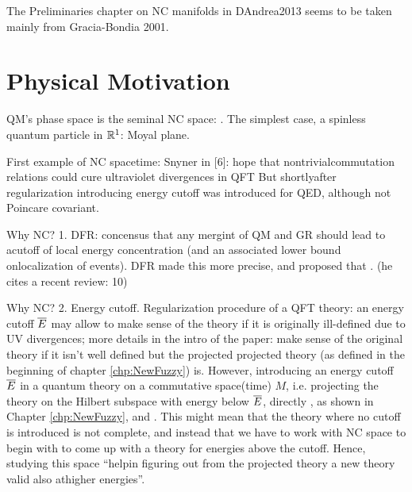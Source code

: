 The Preliminaries chapter on NC manifolds in DAndrea2013 seems to be taken mainly from Gracia-Bondia 2001.

\section{Physical Motivation}

{ \color{gray}
 
    QM's phase space is the seminal NC space: . The simplest case, a spinless quantum particle in $\mathbb{R}^1$: Moyal plane.
    
    First example of NC spacetime:  Snyner in [6]:  hope that nontrivialcommutation relations could cure ultraviolet divergences in QFT But shortlyafter  regularization  introducing  energy  cutoff  was  introduced  for  QED,  although not Poincare covariant.
    
    Why NC? 
    1. DFR:  concensus  that  any  mergint  of  QM  and  GR  should  lead  to  acutoff of local energy concentration (and an associated lower bound onlocalization of events).  DFR made this more precise, and proposed that .  (he cites a recent review:  10)
    
    Why NC?
    2. Energy cutoff. Regularization procedure of a QFT theory: an energy cutoff $\overline{E}$ may allow to make sense of the theory if it is originally ill-defined due to UV divergences; more details in the intro of the paper:  \cite{FioreTheCase2020} make sense of the original theory if it isn't well defined but the projected projected theory (as defined in the beginning of chapter \ref{chp:NewFuzzy}) is. 
    However,  introducing  an  energy  cutoff $\overline{E}$ in  a  quantum  theory  on  a  commutative  space(time) $M$,  i.e.   projecting  the  theory  on  the Hilbert  subspace  with  energy  below $\overline{E}$,  directly  , as shown in Chapter \ref{chp:NewFuzzy}, and  .  
    This might mean that the theory where no cutoff is introduced is not complete,  and instead that we have to work with NC space to begin with to come up with a theory for energies above the cutoff. Hence, studying this space \cite{FioreTheCase2020} ``helpin  figuring  out  from  the  projected  theory  a  new  theory  valid  also  athigher energies''.
    
}

